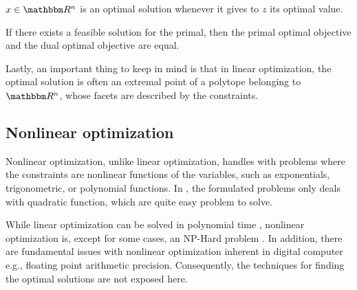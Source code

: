 \begin{definition}
$x\in \mathbbm R^n$ is an optimal solution whenever it gives to $z$ its optimal
value.
\end{definition}

\begin{theorem} \label{th:strong-duality} If there exists a
feasible solution for the primal, then the primal optimal objective and the dual
optimal objective are equal.
\end{theorem}

Lastly, an important thing to keep in mind is that in linear optimization, the
optimal solution is often an extremal point of a polytope belonging to $\mathbbm
R^n$, whose facets are described by the constraints.

\subsection{Nonlinear optimization}
Nonlinear optimization, unlike linear optimization, handles with problems where
the constraints are nonlinear functions of the variables, such as exponentials,
trigonometric, or polynomial functions. In , the
formulated problems only deals with quadratic function, which are quite easy
problem to solve.

While linear optimization can be solved in polynomial time
\cite{karmarkar_new_1984}, nonlinear optimization is, except for some cases, an
NP-Hard problem \cite{hochbaum_complexity_2007}. In addition, there are
fundamental issues with nonlinear optimization inherent in digital computer
e.g., floating point arithmetic precision. Consequently, the techniques for
finding the optimal solutions are not exposed here.